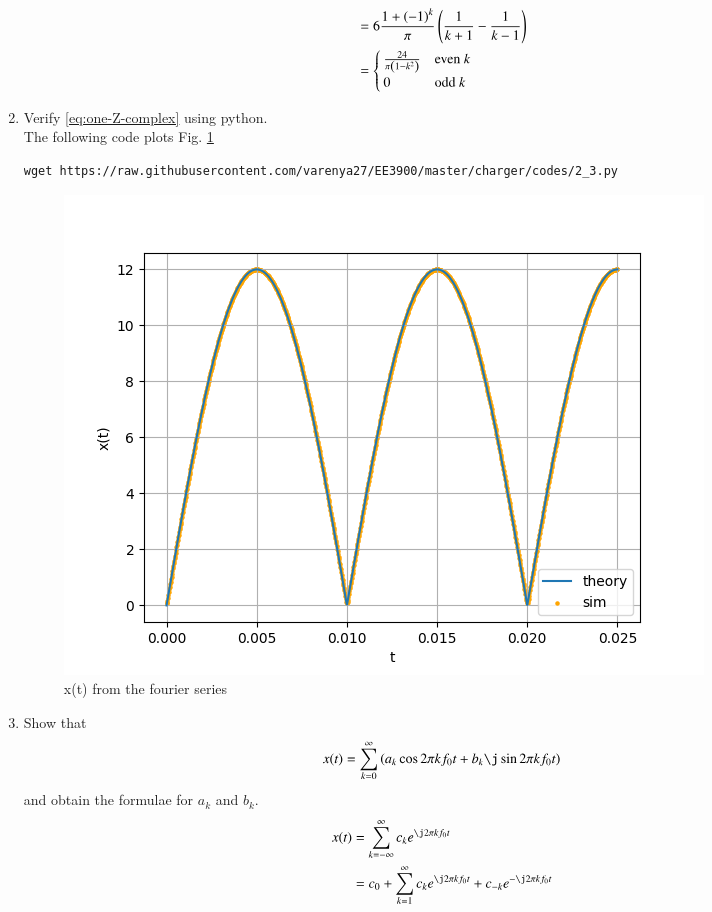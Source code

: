 \documentclass[journal,12pt,twocolumn]{IEEEtran}
\renewcommand\thesection{\arabic{section}}
\begin{document}
\begin{enumerate}[label=\thesection.\arabic*,ref=\thesection.\theenumi]
\begin{align}
        &= 6\frac{1+\left(-1\right)^k}{\pi}\left(\frac{1}{k+1} - \frac{1}{k-1}\right) \\
        &= 
        \begin{cases}
            \frac{24}{\pi\left(1-k^2\right)} & \text{even}\ k \\
            0 &  \text{odd} \ k
        \end{cases}
	\end{align}
\item Verify 
	\eqref{eq:one-Z-complex}
	using python.\\\solution The following code plots Fig. \ref{fig:xt-sim}
	\begin{lstlisting}
wget https://raw.githubusercontent.com/varenya27/EE3900/master/charger/codes/2_3.py
\end{lstlisting}
	\begin{figure}[h!]
	    \centering
	    \includegraphics[width=\columnwidth]{figures/xt-sim.png}
	    \caption{x(t) from the fourier series}
	    \label{fig:xt-sim}
	\end{figure}
	\item Show that 
\begin{align}
	x(t) = \sum_{k = 0}^{\infty}\brak{a_k\cos{2\pi kf_0 t}+b_k\j\sin{2\pi kf_0 t}}
\label{eq:one-Z-real}
\end{align}
and obtain the formulae for $a_k$ and $b_k$.
\\\solution
\begin{align}
    x(t) &= \sum_{k = -\infty}^{\infty}c_ke^{\j2\pi kf_0 t} \\
         &= c_0 + \sum_{k = 1}^{\infty}c_ke^{\j2\pi kf_0t} + c_{-k}e^{-\j2\pi kf_0t} \\

\end{align}
\end{enumerate}
\end{document}
